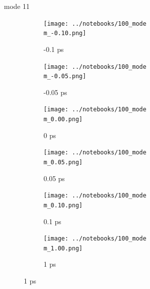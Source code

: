 \documentclass{beamer}
\begin{document}
\renewcommand\m{11}
\begin{frame}{mode \m}
	\begin{figure}
		\centering
		\begin{subfigure}[b]{\w\textwidth}
			\centering
			\texttt{[image: ../notebooks/100\_mode\\m\_-0.10.png]}
			\caption{-0.1 ps}
		\end{subfigure}
		\begin{subfigure}[b]{\w\textwidth}
			\centering
			\texttt{[image: ../notebooks/100\_mode\\m\_-0.05.png]}
			\caption{-0.05 ps}
		\end{subfigure}
		\begin{subfigure}[b]{\w\textwidth}
			\centering
			\texttt{[image: ../notebooks/100\_mode\\m\_0.00.png]}
			\caption{0 ps}
		\end{subfigure}
		\begin{subfigure}[b]{\w\textwidth}
			\centering
			\texttt{[image: ../notebooks/100\_mode\\m\_0.05.png]}
			\caption{0.05 ps}
		\end{subfigure}
		\begin{subfigure}[b]{\w\textwidth}
			\centering
			\texttt{[image: ../notebooks/100\_mode\\m\_0.10.png]}
			\caption{0.1 ps}
		\end{subfigure}
		\begin{subfigure}[b]{\w\textwidth}
			\centering
			\texttt{[image: ../notebooks/100\_mode\\m\_1.00.png]}
			\caption{1 ps}
		\end{subfigure}
	\end{figure}
\end{frame}
\end{document}
